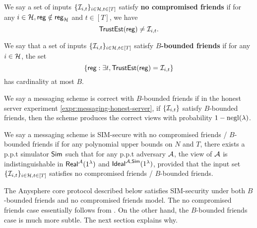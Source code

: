 
\begin{definition}
\label{defn:messaging-security-weaker}
We say a set of inputs $\{\mathcal{I}_{i, t}\}_{i \in \mathcal{H}, t \in [T]}$ satisfy \textbf{no compromised friends} if for any $i \in \mathcal{H}, \mathsf{reg} \notin \mathsf{reg}_{\mathcal{H}}$ and $t \in [T]$, we have
$$\mathsf{TrustEst}(\mathsf{reg}) \neq \mathcal{I}_{i, t}.$$

We say that a set of inputs $\{\mathcal{I}_{i, t}\}_{i \in \mathcal{H}, t \in [T]}$ satisfy \textbf{$B$-bounded friends} if for any $i \in \mathcal{H}$, the set
$$\{\mathsf{reg}: \exists t, \mathsf{TrustEst}(\mathsf{reg}) = \mathcal{I}_{i, t}\}$$
has cardinality at most $B$.

We say a messaging scheme is correct with $B$-bounded friends if in the honest server experiment \cref{expr:messaging-honest-server}, if $\{\mathcal{I}_{i, t}\}$ satisfy $B$-bounded friends, then the scheme produces the correct views with probability $1 - \operatorname{negl}(\lambda)$.

We say a messaging scheme is SIM-secure with no compromised friends / $B$-bounded friends if for any polynomial upper bounds on $N$ and $T$, there exists a p.p.t simulator $\mathsf{Sim}$ such that for any p.p.t adversary $\mathcal{A}$, the view of $\mathcal{A}$ is indistinguishable in $\mathsf{Real}^{\mathcal{A}}(1^{\lambda})$ and $\mathsf{Ideal}^{\mathcal{A}, \mathsf{\mathsf{Sim}}}(1^{\lambda})$, provided that the input set $\{\mathcal{I}_{i, t}\}_{i \in \mathcal{H}, t \in [T]}$ satisfies no compromised friends / $B$-bounded friends.
\end{definition}
The Anysphere core protocol described below satisfies SIM-security under both $B$-bounded friends and no compromised friends model. The no compromised friends case essentially follows from \cite[Appendix C]{angel2018thesis}. On the other hand, the $B$-bounded friends case is much more subtle. The next section explains why.